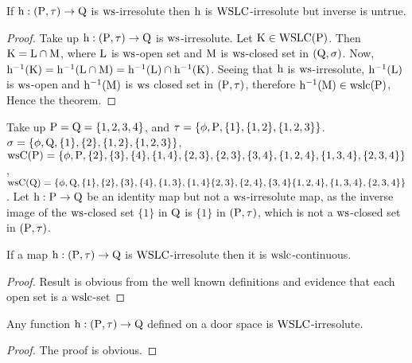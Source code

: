 \begin{thm}\label{thm6.4.3}
If $\mathrm{h}: (\mathrm{P}, \tau) \to \mathrm{Q}$ is $\mathrm{ws}$-irresolute then $\mathrm{h}$ is $\mathrm{WSLC}$-irresolute but inverse is untrue.
\end{thm}

\begin{proof}
Take up $\mathrm{h} : (\mathrm{P}, \tau) \to \mathrm{Q}$ is $\mathrm{ws}$-irresolute. Let $\mathrm{K} \in \mathrm{WSLC}(\mathrm{P})$. Then $\mathrm{K} = \mathrm{L} \cap \mathrm{M}$, where $\mathrm{L}$ is $\mathrm{ws}$-open set and $\mathrm{M}$ is $\mathrm{ws}$-closed set in $(\mathrm{Q}, \sigma)$. Now, $\mathrm{h}^{-1} (\mathrm{K}) = \mathrm{h}^{-1} (\mathrm{L} \cap \mathrm{M}) = \mathrm{h}^{-1} (\mathrm{L}) \cap \mathrm{h}^{-1} (\mathrm{K})$. Seeing that $\mathrm{h}$ is $\mathrm{ws}$-irresolute, $\mathrm{h}^{-1}(\mathrm{L})$ is $\mathrm{ws}$-open and $\mathrm{h}^{-1}(\mathrm{M})$ is $\mathrm{ws}$ closed set in $(\mathrm{P}, \tau)$, therefore $\mathrm{h}^{-1}(\mathrm{M})\in \mathrm{ws}\mathrm{lc}(\mathrm{P})$, Hence the theorem.
\end{proof}

\begin{exm}\label{exam6.4.4}
Take up $\mathrm{P} = \mathrm{Q} = \{1, 2, 3, 4\}$, and $\tau= \{\phi, \mathrm{P}, \{1\}, \{1, 2\}, \{1, 2, 3\}\}$. $\sigma = \{\phi, \mathrm{Q}, \{1\}, \{2\}, \{1, 2\}, \{1, 2, 3\}\}$, $\ws\TSC(\TSP) = \{\phi, \TSP, \{2\}, \{3\}, \{4\}, \{1, 4\}, \{2,3\},\break \{2,3\},\{3,4\}, \{1,2, 4\},\{1,3,4\},\{2,3,4\}\}$, $\ws\TSC(\TSQ) = \{\phi, \TSQ,\{1\}, \{2\}, \{3\}, \{4\}, \{1, 3\},\break \{1, 4\} \{2,3\}, \{2,4\}, \{3,4\}\{1,2, 4\},\{1,3,4\},\{2,3,4\}\}$. Let $\mathrm{h} : \mathrm{P} \to \mathrm{Q}$ be an identity map but not a $\mathrm{ws}$-irresolute map, as the inverse image of the $\mathrm{ws}$-closed set $\{1\}$ in $\mathrm{Q}$ is $\{1\}$ in $(\mathrm{P}, \tau)$, which is not a $\mathrm{ws}$-closed set in $(\mathrm{P}, \tau)$.
\end{exm}

\begin{thm}\label{thm6.4.5}
If a map $\mathrm{h}: (\mathrm{P}, \tau) \to \mathrm{Q}$ is $\mathrm{WSLC}$-irresolute then it is $\mathrm{ws}\mathrm{lc}$-continuous.
\end{thm}

\begin{proof}
Result is obvious from the well known definitions and evidence that each open set is a $\mathrm{ws}\mathrm{lc}$-set
\end{proof}

\begin{thm}\label{thm6.4.6}
Any function $\mathrm{h} : (\mathrm{P}, \tau) \to \mathrm{Q}$ defined on a door space is $\mathrm{WSLC}$-irresolute.
\end{thm}

\begin{proof}
The proof is obvious.
\end{proof}

